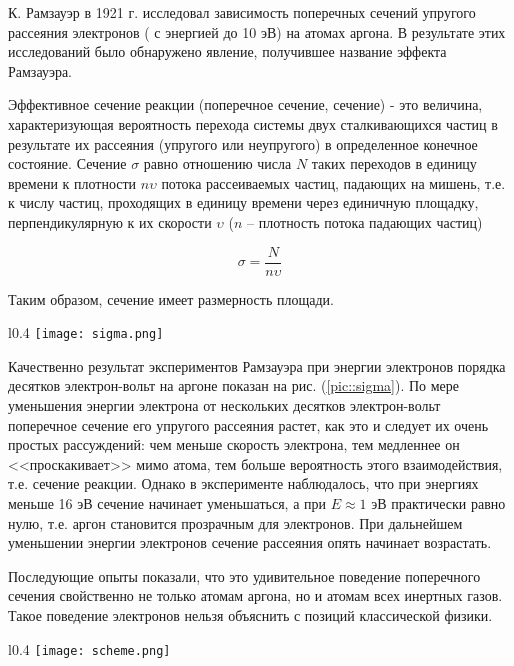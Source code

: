 К. Рамзауэр в 1921 г. исследовал зависимость поперечных сечений упругого
рассеяния электронов ( с энергией до 10 эВ) на атомах аргона. В результате этих
исследований было обнаружено явление, получившее название эффекта Рамзауэра.

Эффективное сечение реакции (поперечное сечение, сечение) - это величина,
характеризующая вероятность перехода системы двух сталкивающихся частиц в
результате их рассеяния (упругого или неупругого) в определенное конечное
состояние. Сечение $\sigma$ равно отношению числа $N$ таких переходов в единицу
времени к плотности $n \upsilon$ потока рассеиваемых частиц, падающих на мишень,
т.е. к числу частиц, проходящих в единицу времени через единичную площадку,
перпендикулярную к их скорости $\upsilon$ ($n$ -- плотность потока падающих
частиц)

\begin{equation} \label{sigma}
  \sigma = \frac{N}{n \upsilon}
\end{equation}

Таким образом, сечение имеет размерность площади.

\begin{wrapfigure}[13]{l}{0.4\linewidth}
  \texttt{[image: sigma.png]}
  \caption{Качественная картина результатов измерения упругого рассеяния
  электронов в аргоне}
  \label{pic::sigma}
\end{wrapfigure}

Качественно результат экспериментов Рамзауэра при энергии электронов порядка
десятков электрон-вольт на аргоне показан на рис. (\ref{pic::sigma}). По мере
уменьшения энергии электрона от нескольких десятков электрон-вольт поперечное
сечение его упругого рассеяния растет, как это и следует их очень простых
рассуждений: чем меньше скорость электрона, тем медленнее он <<проскакивает>>
мимо атома, тем больше вероятность этого взаимодействия, т.е. сечение реакции.
Однако в эксперименте наблюдалось, что при энергиях меньше 16 эВ сечение
начинает уменьшаться, а при $E \approx 1$ эВ практически равно нулю, т.е. аргон
становится прозрачным для электронов. При дальнейшем уменьшении энергии
электронов сечение рассеяния опять начинает возрастать.

Последующие опыты показали, что это удивительное поведение поперечного сечения
свойственно не только атомам аргона, но и атомам всех инертных газов. Такое
поведение электронов нельзя объяснить с позиций классической физики.

\begin{wrapfigure}[13]{l}{0.4\linewidth}
  \texttt{[image: scheme.png]}
  \caption{Схема установки для измерения сечения рассеяния электронов в газах}
  \label{pic::scheme}
\end{wrapfigure}

